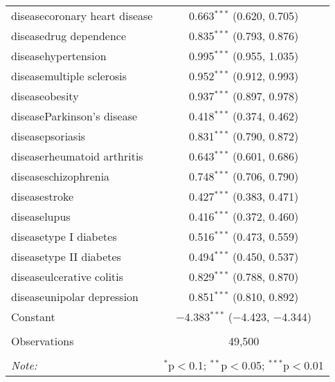 \begin{table}[!htbp]
\begin{tabular}{@{\extracolsep{5pt}}lc}
  diseasecoronary heart disease & 0.663$^{***}$ (0.620, 0.705) \\ 
  diseasedrug dependence & 0.835$^{***}$ (0.793, 0.876) \\ 
  diseasehypertension & 0.995$^{***}$ (0.955, 1.035) \\ 
  diseasemultiple sclerosis & 0.952$^{***}$ (0.912, 0.993) \\ 
  diseaseobesity & 0.937$^{***}$ (0.897, 0.978) \\ 
  diseaseParkinson's disease & 0.418$^{***}$ (0.374, 0.462) \\ 
  diseasepsoriasis & 0.831$^{***}$ (0.790, 0.872) \\ 
  diseaserheumatoid arthritis & 0.643$^{***}$ (0.601, 0.686) \\ 
  diseaseschizophrenia & 0.748$^{***}$ (0.706, 0.790) \\ 
  diseasestroke & 0.427$^{***}$ (0.383, 0.471) \\ 
  diseaselupus & 0.416$^{***}$ (0.372, 0.460) \\ 
  diseasetype I diabetes & 0.516$^{***}$ (0.473, 0.559) \\ 
  diseasetype II diabetes & 0.494$^{***}$ (0.450, 0.537) \\ 
  diseaseulcerative colitis & 0.829$^{***}$ (0.788, 0.870) \\ 
  diseaseunipolar depression & 0.851$^{***}$ (0.810, 0.892) \\ 
  Constant & $-$4.383$^{***}$ ($-$4.423, $-$4.344) \\ 
 \hline \\[-1.8ex] 
Observations & 49,500 \\ 
\hline 
\hline \\[-1.8ex] 
\textit{Note:}  & \multicolumn{1}{r}{$^{*}$p$<$0.1; $^{**}$p$<$0.05; $^{***}$p$<$0.01} \\ 
\end{tabular} 
\end{table} 
